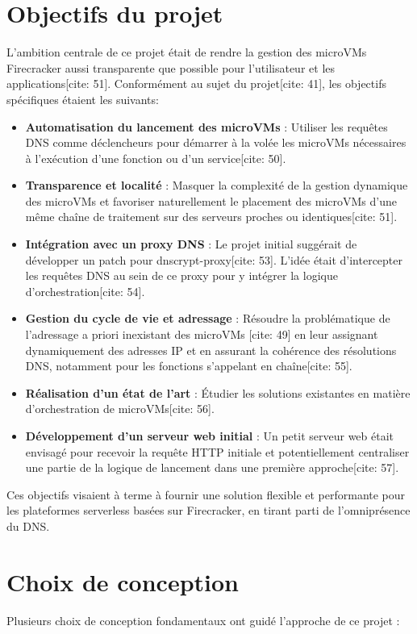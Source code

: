 \documentclass[12pt]{article}
\begin{document}
\section{Objectifs du projet}
L'ambition centrale de ce projet était de rendre la gestion des microVMs Firecracker aussi transparente que possible pour l'utilisateur et les applications[cite: 51]. Conformément au sujet du projet[cite: 41], les objectifs spécifiques étaient les suivants:
\begin{itemize}
    \item \textbf{Automatisation du lancement des microVMs} : Utiliser les requêtes DNS comme déclencheurs pour démarrer à la volée les microVMs nécessaires à l'exécution d'une fonction ou d'un service[cite: 50].
    \item \textbf{Transparence et localité} : Masquer la complexité de la gestion dynamique des microVMs et favoriser naturellement le placement des microVMs d'une même chaîne de traitement sur des serveurs proches ou identiques[cite: 51].
    \item \textbf{Intégration avec un proxy DNS} : Le projet initial suggérait de développer un patch pour dnscrypt-proxy[cite: 53]. L'idée était d'intercepter les requêtes DNS au sein de ce proxy pour y intégrer la logique d'orchestration[cite: 54].
    \item \textbf{Gestion du cycle de vie et adressage} : Résoudre la problématique de l'adressage a priori inexistant des microVMs [cite: 49] en leur assignant dynamiquement des adresses IP et en assurant la cohérence des résolutions DNS, notamment pour les fonctions s'appelant en chaîne[cite: 55].
    \item \textbf{Réalisation d'un état de l'art} : Étudier les solutions existantes en matière d'orchestration de microVMs[cite: 56].
    \item \textbf{Développement d'un serveur web initial} : Un petit serveur web était envisagé pour recevoir la requête HTTP initiale et potentiellement centraliser une partie de la logique de lancement dans une première approche[cite: 57].
\end{itemize}
Ces objectifs visaient à terme à fournir une solution flexible et performante pour les plateformes serverless basées sur Firecracker, en tirant parti de l'omniprésence du DNS.

\section{Choix de conception}
Plusieurs choix de conception fondamentaux ont guidé l'approche de ce projet :
\end{document}
